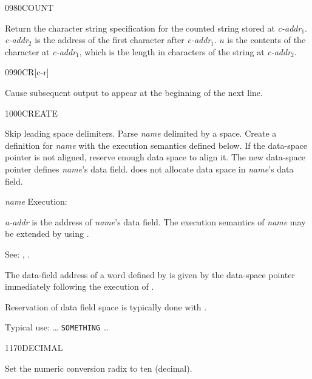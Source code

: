 \begin{newword}{0980}{COUNT}

	Return the character string specification for the counted
	string stored at \emph{c-addr}$_1$. \emph{c-addr}$_2$ is the
	address of the first character after \emph{c-addr}$_1$. $u$ is
	the contents of the character at \emph{c-addr}$_1$, which is
	the length in characters of the string at \emph{c-addr}$_2$.
\end{newword}


\begin{newword}{0990}{CR}[c-r]
	\stack{}{}

	Cause subsequent output to appear at the beginning of the next
	line.
\end{newword}


\begin{newword}{1000}{CREATE}

	Skip leading space delimiters. Parse \emph{name} delimited by a
	space. Create a definition for \emph{name} with the execution
	semantics defined below. If the data-space pointer is not
	aligned, reserve enough data space to align it. The new
	data-space pointer defines \emph{name}'s data field.
	 does not allocate data space in \emph{name}'s
	data field.

\item[\emph{name} Execution:]

	\emph{a-addr} is the address of \emph{name}'s data field. The
	execution semantics of \emph{name} may be extended by using
	.

\item[See:]	
	,
	.

	\begin{rationale} %
		The data-field address of a word defined by  is
		given by the data-space pointer immediately following the
		execution of .

		Reservation of data field space is typically done with
		.

		Typical use: {\ldots}
			 \texttt{SOMETHING} {\ldots}
	\end{rationale}
\end{newword}


\begin{newword}{1170}{DECIMAL}
	\stack{}{}

	Set the numeric conversion radix to ten (decimal).
\end{newword}


